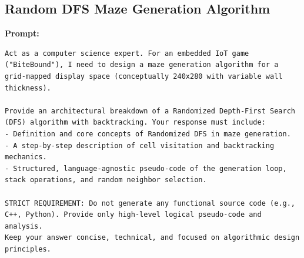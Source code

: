 \subsection*{Random DFS Maze Generation Algorithm}

\textbf{Prompt:}
\begin{lstlisting}[language={}, breaklines=true]
Act as a computer science expert. For an embedded IoT game ("BiteBound"), I need to design a maze generation algorithm for a grid-mapped display space (conceptually 240x280 with variable wall thickness).

Provide an architectural breakdown of a Randomized Depth-First Search (DFS) algorithm with backtracking. Your response must include:
- Definition and core concepts of Randomized DFS in maze generation.
- A step-by-step description of cell visitation and backtracking mechanics.
- Structured, language-agnostic pseudo-code of the generation loop, stack operations, and random neighbor selection.

STRICT REQUIREMENT: Do not generate any functional source code (e.g., C++, Python). Provide only high-level logical pseudo-code and analysis.
Keep your answer concise, technical, and focused on algorithmic design principles.
\end{lstlisting}

